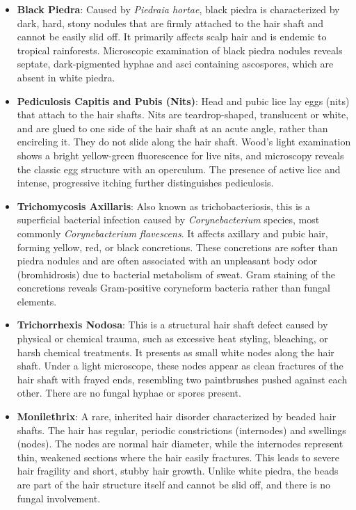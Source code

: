 \begin{itemize}
    \item \textbf{Black Piedra}: Caused by \textit{Piedraia hortae}, black piedra is characterized by dark, hard, stony nodules that are firmly attached to the hair shaft and cannot be easily slid off. It primarily affects scalp hair and is endemic to tropical rainforests. Microscopic examination of black piedra nodules reveals septate, dark-pigmented hyphae and asci containing ascospores, which are absent in white piedra.
    \item \textbf{Pediculosis Capitis and Pubis (Nits)}: Head and pubic lice lay eggs (nits) that attach to the hair shafts. Nits are teardrop-shaped, translucent or white, and are glued to one side of the hair shaft at an acute angle, rather than encircling it. They do not slide along the hair shaft. Wood's light examination shows a bright yellow-green fluorescence for live nits, and microscopy reveals the classic egg structure with an operculum. The presence of active lice and intense, progressive itching further distinguishes pediculosis.
    \item \textbf{Trichomycosis Axillaris}: Also known as trichobacteriosis, this is a superficial bacterial infection caused by \textit{Corynebacterium} species, most commonly \textit{Corynebacterium flavescens}. It affects axillary and pubic hair, forming yellow, red, or black concretions. These concretions are softer than piedra nodules and are often associated with an unpleasant body odor (bromhidrosis) due to bacterial metabolism of sweat. Gram staining of the concretions reveals Gram-positive coryneform bacteria rather than fungal elements.
    \item \textbf{Trichorrhexis Nodosa}: This is a structural hair shaft defect caused by physical or chemical trauma, such as excessive heat styling, bleaching, or harsh chemical treatments. It presents as small white nodes along the hair shaft. Under a light microscope, these nodes appear as clean fractures of the hair shaft with frayed ends, resembling two paintbrushes pushed against each other. There are no fungal hyphae or spores present.
    \item \textbf{Monilethrix}: A rare, inherited hair disorder characterized by beaded hair shafts. The hair has regular, periodic constrictions (internodes) and swellings (nodes). The nodes are normal hair diameter, while the internodes represent thin, weakened sections where the hair easily fractures. This leads to severe hair fragility and short, stubby hair growth. Unlike white piedra, the beads are part of the hair structure itself and cannot be slid off, and there is no fungal involvement.

\end{itemize}
